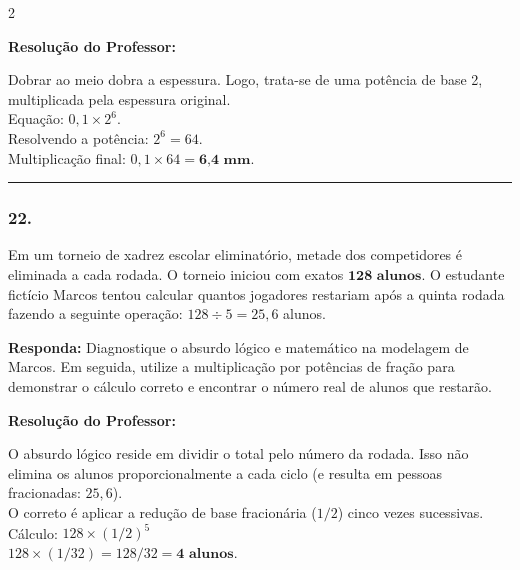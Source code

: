 \begin{multicols*}{2}
\ifgabarito
    \begin{tcolorbox}[colback=CorTitUm!5, colframe=CorTitUm, boxrule=1pt, arc=4pt, left=6pt, right=6pt, top=6pt, bottom=6pt]
    \small\textbf{\textcolor{CorTitUm}{Resolução do Professor:}}\par\vspace{0.1cm}
    \color{CinzaEscuro}
    Dobrar ao meio dobra a espessura. Logo, trata-se de uma potência de base 2, multiplicada pela espessura original.\\
    Equação: $ 0,1 \times 2^{6} $.\\
    Resolvendo a potência: $ 2^{6} = 64 $.\\
    Multiplicação final: $ 0,1 \times 64 = \textbf{6,4 mm} $.
    \end{tcolorbox}
\fi

\par\vspace{\espacoQuestao}

\noindent\textcolor{CorLinha}{\rule{\linewidth}{0.5pt}} 
\par\vspace{\espacoPreQuestao}
\subsubsection*{22.} Em um torneio de xadrez escolar eliminatório, metade dos competidores é eliminada a cada rodada. O torneio iniciou com exatos $ \textbf{128 alunos} $. O estudante fictício Marcos tentou calcular quantos jogadores restariam após a quinta rodada fazendo a seguinte operação: $ 128 \div 5 = 25,6 $ alunos.
\begin{boxresponda}
\textbf{Responda:} Diagnostique o absurdo lógico e matemático na modelagem de Marcos. Em seguida, utilize a multiplicação por potências de fração para demonstrar o cálculo correto e encontrar o número real de alunos que restarão.
\end{boxresponda}

\ifgabarito
    \begin{tcolorbox}[colback=CorTitUm!5, colframe=CorTitUm, boxrule=1pt, arc=4pt, left=6pt, right=6pt, top=6pt, bottom=6pt]
    \small\textbf{\textcolor{CorTitUm}{Resolução do Professor:}}\par\vspace{0.1cm}
    \color{CinzaEscuro}
    O absurdo lógico reside em dividir o total pelo número da rodada. Isso não elimina os alunos proporcionalmente a cada ciclo (e resulta em pessoas fracionadas: $25,6$).\\
    O correto é aplicar a redução de base fracionária ($1/2$) cinco vezes sucessivas.\\
    Cálculo: $ 128 \times (1/2)^{5} $\\
    $ 128 \times (1/32) = 128 / 32 = \textbf{4 alunos} $.
    \end{tcolorbox}
\fi


\end{multicols*}
